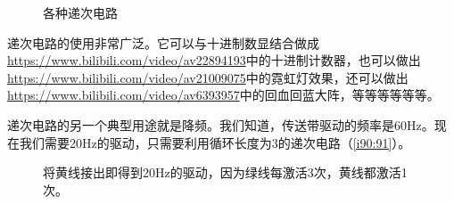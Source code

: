 \begin{figure}[p]
\begin{center}
{}
\qquad
{}
\qquad
{}
\end{center}
\caption{各种递次电路}
\label{i74:85}
\end{figure}

递次电路的使用非常广泛。它可以与十进制数显结合做成\url{https://www.bilibili.com/video/av22894193}中的十进制计数器，也可以做出\url{https://www.bilibili.com/video/av21009075}中的霓虹灯效果，还可以做出\url{https://www.bilibili.com/video/av6393957}中的回血回蓝大阵，等等等等等等。

递次电路的另一个典型用途就是降频。我们知道，传送带驱动的频率是60Hz。现在我们需要20Hz的驱动，只需要利用循环长度为3的递次电路（\autoref{i90:91}）。

\begin{figure}[!h]
\begin{center}
\end{center}
\caption{将黄线接出即得到20Hz的驱动，因为绿线每激活3次，黄线都激活1次。}
\label{i90:91}
\end{figure}

